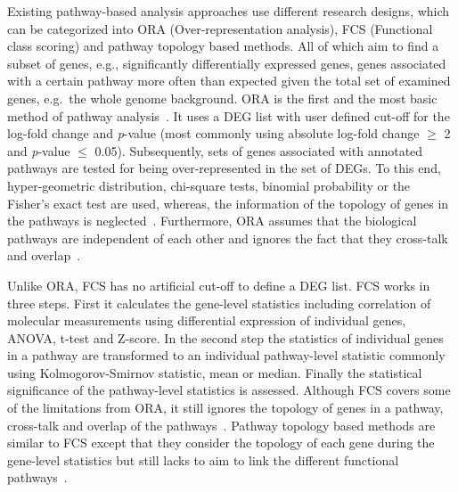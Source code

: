 \documentclass[10pt,a4paper,twocolumn]{article}
\begin{document}
	
	Existing pathway-based analysis approaches use different
        research designs, which can be categorized into ORA
        (Over-representation analysis), FCS (Functional class scoring)
        and pathway topology based methods. All of which aim to find a
        subset of genes, e.g., significantly differentially expressed
        genes, genes associated with a certain pathway more often than
        expected given the total set of examined genes, e.g.~the whole
        genome background. ORA is the first and the most basic method
        of pathway analysis~\cite{Campos}. It uses a DEG list with
        user defined cut-off for the log-fold change and
        \textit{p}-value (most commonly using absolute log-fold change
        $\geq$ 2 and \textit{p}-value $\leq$ 0.05). Subsequently, sets
        of genes associated with annotated pathways are tested for
        being over-represented in the set of DEGs. To this end,
        hyper-geometric distribution, chi-square tests, binomial
        probability or the Fisher’s exact test are used, whereas, the
        information of the topology of genes in the pathways is
        neglected~\cite{Bayer}. Furthermore, ORA assumes that the
        biological pathways are independent of each other and ignores
        the fact that they cross-talk and
        overlap~\cite{Khatri2012,Campos}.
	
	Unlike ORA, FCS has no artificial cut-off to define a DEG list. FCS works in
	three steps. First it calculates the gene-level statistics including
	correlation of molecular measurements using differential expression of
	individual genes, ANOVA, t-test and Z-score. In the second step the
	statistics of individual genes in a pathway are transformed to an
	individual pathway-level statistic commonly using Kolmogorov-Smirnov
	statistic, mean or median. Finally the statistical significance of the
	pathway-level statistics is assessed. Although FCS covers some of the
	limitations from ORA, it still ignores the topology of genes in a pathway,
	cross-talk and overlap of the pathways~\cite{Khatri2012,Campos}. Pathway
	topology based methods are similar to FCS except that they consider the
	topology of each gene during the gene-level statistics but still lacks to aim
	to link the different functional pathways~\cite{Khatri2012}.
	
\end{document}
